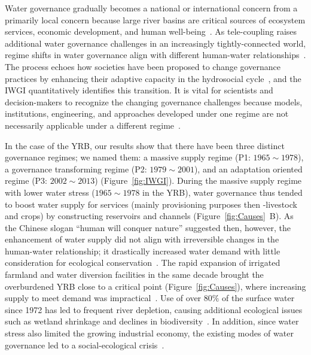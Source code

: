 
Water governance gradually becomes a national or international concern from a primarily local concern because large river basins are critical sources of ecosystem services, economic development, and human well-being~\cite{best2019,best2020}.
As tele-coupling raises additional water governance challenges in an increasingly tightly-connected world, regime shifts in water governance align with different human-water relationships~\cite{diaz2019}.
The process echoes how societies have been proposed to change governance practices by enhancing their adaptive capacity in the hydrosocial cycle~\cite{loch2020,turton1999}, and the IWGI quantitatively identifies this transition.
It is vital for scientists and decision-makers to recognize the changing governance challenges because models, institutions, engineering, and approaches developed under one regime are not necessarily applicable under a different regime~\cite{reyers2018}.

In the case of the YRB, our results show that there have been three distinct governance regimes; we named them: a massive supply regime (P1: $1965 \sim 1978$), a governance transforming regime (P2: $1979 \sim 2001$), and an adaptation oriented regime (P3: $2002 \sim 2013$) (Figure~\ref{fig:IWGI}).
During the massive supply regime with lower water stress ($1965 \sim 1978$ in the YRB), water governance thus tended to boost water supply for services (mainly provisioning purposes then -livestock and crops) by constructing reservoirs and channels (Figure~\ref{fig:Causes}~B).
As the Chinese slogan ``human will conquer nature'' suggested then, however, the enhancement of water supply did not align with irreversible changes in the human-water relationship; it drastically increased water demand with little consideration for ecological conservation~\cite{zhou2020}.
The rapid expansion of irrigated farmland and water diversion facilities in the same decade brought the overburdened YRB close to a critical point (Figure~\ref{fig:Causes}), where increasing supply to meet demand was impractical~\cite{loch2020}.
Use of over $80\%$ of the surface water since 1972 has led to frequent river depletion, causing additional ecological issues such as wetland shrinkage and declines in biodiversity~\cite{wang2019c}.
In addition, since water stress also limited the growing industrial economy, the existing modes of water governance led to a social-ecological crisis~\cite{wohlfart2016}.

